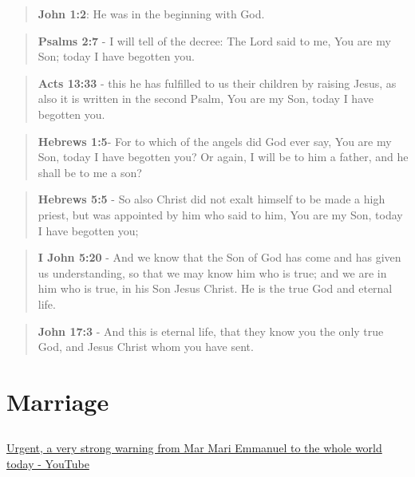 \documentclass[11pt]{article}
\begin{document}
\begin{quote}
\textbf{John 1:2}: He was in the beginning with God.
\end{quote}

\begin{quote}
\textbf{Psalms 2:7} - I will tell of the decree: The Lord said to me, You are my Son; today I have begotten you.
\end{quote}

\begin{quote}
\textbf{Acts 13:33} - this he has fulfilled to us their children by raising Jesus, as also it is written in the second Psalm, You are my Son, today I have begotten you.
\end{quote}

\begin{quote}
\textbf{Hebrews 1:5}- For to which of the angels did God ever say, You are my Son, today I have begotten you? Or again, I will be to him a father, and he shall be to me a son?
\end{quote}

\begin{quote}
\textbf{Hebrews 5:5} - So also Christ did not exalt himself to be made a high priest, but was appointed by him who said to him, You are my Son, today I have begotten you;
\end{quote}

\begin{quote}
\textbf{I John 5:20} - And we know that the Son of God has come and has given us understanding, so that we may know him who is true; and we are in him who is true, in his Son Jesus Christ. He is the true God and eternal life.
\end{quote}

\begin{quote}
\textbf{John 17:3} - And this is eternal life, that they know you the only true God, and Jesus Christ whom you have sent.
\end{quote}

\section{Marriage}
\label{sec:orga6f551c}
\subsection{}
\label{sec:org8c018f8}
\href{https://youtu.be/o4\_OXvDnqDE?t=1271}{Urgent, a very strong warning from Mar Mari Emmanuel to the whole world today - YouTube}
\end{document}
